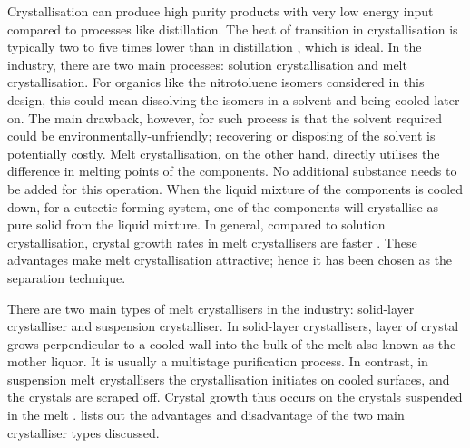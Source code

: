 Crystallisation can produce high purity products with very low energy input compared to processes like distillation. The heat of transition in crystallisation is typically two to five times lower than in distillation \cite{bassett_melt_2021}, which is ideal. In the industry, there are two main processes: solution crystallisation and melt crystallisation. For organics like the nitrotoluene isomers considered in this design, this could mean dissolving the isomers in a solvent and being cooled later on. The main drawback, however, for such process is that the solvent required could be environmentally-unfriendly; recovering or disposing of the solvent is potentially costly. Melt crystallisation, on the other hand, directly utilises the difference in melting points of the components. No additional substance needs to be added for this operation. When the liquid mixture of the components is cooled down, for a eutectic-forming system, one of the components will crystallise as pure solid from the liquid mixture. In general, compared to solution crystallisation, crystal growth rates in melt crystallisers are faster \cite{myerson_handbook_2019}. These advantages make melt crystallisation attractive; hence it has been chosen as the separation technique. 


There are two main types of melt crystallisers in the industry: solid-layer crystalliser and suspension crystalliser. In solid-layer crystallisers, layer of crystal grows perpendicular to a cooled wall into the bulk of the melt also known as the mother liquor. It is usually a multistage purification process. In contrast, in suspension melt crystallisers the crystallisation initiates on cooled surfaces, and the crystals are scraped off. Crystal growth thus occurs on the crystals suspended in the melt \cite{myerson_handbook_2019}.  lists out the advantages and disadvantage of the two main crystalliser types discussed. 

